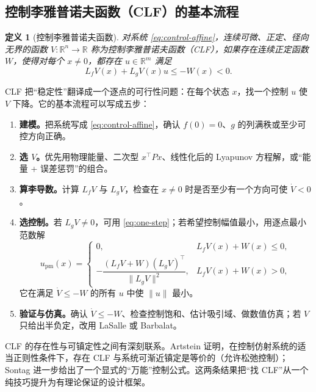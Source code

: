 \documentclass[11pt, a4paper, UTF8, fontset=none]{ctexart}
\theoremstyle{cnthm}
\newtheorem{definition}{定义}[section]
\newcommand{\R}{\mathbb{R}}
\newcommand{\norm}[1]{\lVert #1\rVert}
\newcommand{\Lf}{L_f}
\newcommand{\Lg}{L_g}
\begin{document}
\subsection{控制李雅普诺夫函数（CLF）的基本流程}

\begin{definition}[控制李雅普诺夫函数]
对系统 \eqref{eq:control-affine}，连续可微、正定、径向无界的函数 $V:\R^n\to\R$ 称为控制李雅普诺夫函数（CLF），如果存在连续正定函数 $W$，使得对每个 $x\ne0$，都存在 $u\in\R^m$ 满足
\begin{equation}
  \Lf V(x)+\Lg V(x)u\le -W(x)<0.
  \label{eq:clf}
\end{equation}
\end{definition}

CLF 把“稳定性”翻译成一个逐点的可行性问题：在每个状态 $x$，找一个控制 $u$ 使 $V$ 下降。它的基本流程可以写成五步：
\begin{enumerate}[label=\textbf{步骤 \arabic*}：]
  \item \textbf{建模。}把系统写成 \eqref{eq:control-affine}，确认 $f(0)=0$、$g$ 的列满秩或至少可控方向正确。
  \item \textbf{选 $V$。}优先用物理能量、二次型 $x^\top Px$、线性化后的 Lyapunov 方程解，或“能量 + 误差惩罚”的组合。
  \item \textbf{算李导数。}计算 $\Lf V$ 与 $\Lg V$，检查在 $x\ne0$ 时是否至少有一个方向可使 $\dot V<0$。
  \item \textbf{选控制。}若 $\Lg V\ne0$，可用 \eqref{eq:one-step}；若希望控制幅值最小，用逐点最小范数解
  \begin{equation}
    u_{\mathrm{pm}}(x)=
    \begin{cases}
      0, & \Lf V(x)+W(x)\le0,\\[3pt]
      -\dfrac{(\Lf V+W)(\Lg V)^\top}{\norm{\Lg V}^2}, & \Lf V(x)+W(x)>0,
    \end{cases}
    \label{eq:min-norm}
  \end{equation}
  它在满足 $\dot V\le-W$ 的所有 $u$ 中使 $\norm{u}$ 最小。
  \item \textbf{验证与仿真。}确认 $\dot V\le-W$、检查控制饱和、估计吸引域、做数值仿真；若 $V$ 只给出半负定，改用 LaSalle 或 Barbalat。
\end{enumerate}

CLF 的存在性与可镇定性之间有深刻联系。Artstein 证明，在控制仿射系统的适当正则性条件下，存在 CLF 与系统可渐近镇定是等价的（允许松弛控制）\cite{Artstein1983}；Sontag 进一步给出了一个显式的“万能”控制公式\cite{Sontag1989}。这两条结果把“找 CLF”从一个纯技巧提升为有理论保证的设计框架。
\end{document}
